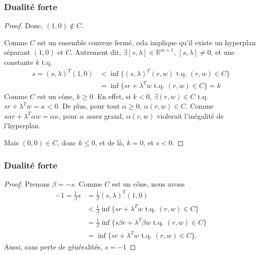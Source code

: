 \documentclass[usepdftitle=false]{beamer}
\def\RR{\mathbb{R}}
\begin{document}
\begin{frame}
\frametitle{Dualité forte}

\begin{proof}
Donc, $(1,0) \notin C$.

\mbox{}

Comme $C$ est un ensemble convexe fermé, cela implique qu'il existe un hyperplan séparant $(1,0)$ et $C$. Autrement dit, $\exists [s, \lambda] \in \RR^{m+1}$, $[s, \lambda] \ne 0$, et une constante $k$ t.q.
\begin{align*}
s = (s, \lambda)^T (1,0) &< \inf \lbrace (s, \lambda)^T(r,w) \mbox{ t.q. } (r,w) \in C \rbrace \\
& = \inf \lbrace sr + \lambda^Tw \mbox{ t.q. } (r,w) \in C \rbrace = k
\end{align*}
Comme $C$ est un cône, $k \geq 0$. En effet, si $k < 0$, $\exists (r,w) \in C$ t.q. $sr + \lambda^T w = \kappa < 0$.
De plus, pour tout $\alpha \geq 0$, $\alpha (r,w) \in C$. Comme $s \alpha r + \lambda^T  \alpha w = \alpha\kappa$, pour $\alpha$ assez grand, $\alpha (r,w)$ violerait l'inégalité de l'hyperplan.

\mbox{}

Mais $(0,0) \in C$, donc $k \leq 0$, et de là, $k = 0$, et $s < 0$.
\end{proof}

\end{frame}

\begin{frame}
\frametitle{Dualité forte}

\begin{proof}
Prenons $\beta = -s$. Comme $C$ est un cône, nous avons
\begin{align*}
-1 = \frac{1}{\beta}s &= \frac{1}{\beta}(s,\lambda)^T(1,0) \\
&< \frac{1}{\beta}\inf \lbrace sr + \lambda^Tw \mbox{ t.q. } (r,w) \in C \rbrace \\
&= \frac{1}{\beta}\inf \lbrace s\beta r + \lambda^T \beta w \mbox{ t.q. } (r,w) \in C \rbrace \\
&= \inf \lbrace s r + \lambda^T w \mbox{ t.q. } (r,w) \in C \rbrace.
\end{align*}
Aussi, sans perte de généralités, $s = -1$

\end{proof}

\end{frame}
\end{document}
